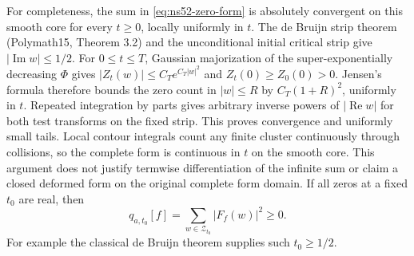 \documentclass[11pt]{article}
\theoremstyle{remark}
\begin{document}
For completeness, the sum in \eqref{eq:ns52-zero-form} is absolutely
convergent on this smooth core for every $t\ge0$, locally uniformly
in $t$. The de Bruijn strip theorem (Polymath15, Theorem 3.2) and
the unconditional initial critical strip give
$|\operatorname{Im} w|\le1/2$. For $0\le t\le T$, Gaussian
majorization of the super-exponentially decreasing $\Phi$ gives
$|Z_t(w)|\le C_T e^{C_T|w|^2}$ and $Z_t(0)\ge Z_0(0)>0$.
Jensen's formula therefore bounds the zero count in $|w|\le R$
by $C_T(1+R)^2$, uniformly in $t$. Repeated integration by parts
gives arbitrary inverse powers of $|\operatorname{Re}w|$ for both
test transforms on the fixed strip. This proves convergence and
uniformly small tails. Local contour integrals count any finite
cluster continuously through collisions, so the complete form is
continuous in $t$ on the smooth core. This argument does not justify
termwise differentiation of the infinite sum or claim a closed
deformed form on the original complete form domain.
If all zeros at a fixed $t_0$ are real, then
\[
 q_{a,t_0}[f]=\sum_{w\in\mathcal Z_{t_0}}|F_f(w)|^2\ge0.
\]
For example the classical de Bruijn theorem supplies such $t_0\ge1/2$.
\end{document}
